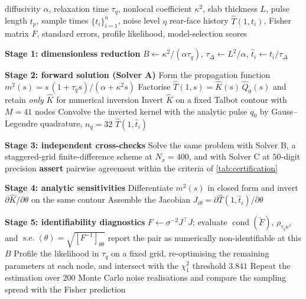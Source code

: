 \documentclass[preprint,12pt,a4paper]{elsarticle}
\theoremstyle{plain}
\theoremstyle{definition}
\theoremstyle{remark}
\newcommand{\tq}{\tau_{q}}
\newcommand{\kk}{\kappa^{2}}
\newcommand{\Bnum}{B}
\begin{document}
\begin{algorithm}[htbp]
\caption{Forward evaluation, sensitivity assembly and identifiability
         diagnostics for the Guyer--Krumhansl rear-face problem.}
\label{alg:main}
\begin{algorithmic}[1]
\Require diffusivity $\alpha$, relaxation time $\tq$, nonlocal coefficient
         $\kk$, slab thickness $L$, pulse length $t_p$, sample times
         $\{t_i\}_{i=1}^{n}$, noise level $\eta$
\Ensure  rear-face history $\hat{T}(1,t_i)$, Fisher matrix $F$, standard errors,
         profile likelihood, model-selection scores

\Statex \textbf{Stage 1: dimensionless reduction}
\State $B \gets \kk/(\alpha\tq)$, \;
       $\tau_{\Delta} \gets L^{2}/\alpha$, \;
       $\hat{t}_i \gets t_i/\tau_{\Delta}$

\Statex \textbf{Stage 2: forward solution (Solver A)}
\State Form the propagation function
       $m^{2}(s) = s\,(1+\tq s)/(\alpha + \kk s)$
\State Factorise $\hat{T}(1,s) = \hat{K}(s)\,\hat{Q}_0(s)$ and retain
       \emph{only} $\hat{K}$ for numerical inversion
\State Invert $\hat{K}$ on a fixed Talbot contour with $M=41$ nodes
\State Convolve the inverted kernel with the analytic pulse $q_0$ by
       Gauss--Legendre quadrature, $n_q = 32$
\State \Return $\hat{T}(1,\hat{t}_i)$

\Statex \textbf{Stage 3: independent cross-checks}
\State Solve the same problem with Solver B, a staggered-grid finite-difference
       scheme at $N_x = 400$, and with Solver C at $50$-digit precision
\State \textbf{assert} pairwise agreement within the criteria of
       \cref{tab:certification}

\Statex \textbf{Stage 4: analytic sensitivities}
\For{$\theta \in \{\alpha,\ \tq,\ \kk\}$}
  \State Differentiate $m^{2}(s)$ in closed form and invert
         $\partial\hat{K}/\partial\theta$ on the same contour
\EndFor
\State Assemble the Jacobian $J_{i\theta} = \partial \hat{T}(1,\hat{t}_i)/
       \partial\theta$

\Statex \textbf{Stage 5: identifiability diagnostics}
\State $F \gets \sigma^{-2} J^{\top} J$; evaluate
       $\operatorname{cond}(\tilde F)$, $\rho_{\tq\kk}$ and
       $\operatorname{s.e.}(\theta) = \sqrt{[F^{-1}]_{\theta\theta}}$
  \State report the pair as numerically non-identifiable at this $\Bnum$
\EndIf
\State Profile the likelihood in $\tq$ on a fixed grid, re-optimising the
       remaining parameters at each node, and intersect with the
       $\chi^{2}_{1}$ threshold $3.841$
\State Repeat the estimation over $200$ Monte Carlo noise realisations and
       compare the sampling spread with the Fisher prediction


\end{algorithmic}
\end{algorithm}
\end{document}
